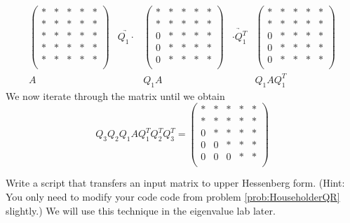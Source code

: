 \[
\begin{array}{ccccc} 
\begin{pmatrix}
* & * & * & * & *\\
* & * & * & * & *\\
* & * & * & * & *\\
* & * & * & * & *\\
* & * & * & * & *\\
\end{pmatrix} 
&\underrightarrow{Q_1 \cdot }&
\begin{pmatrix}
* & * & * & * & *\\
* & * & * & * & *\\
0 & * & * & * & *\\
0 & * & * & * & *\\
0 & * & * & * & *\\
\end{pmatrix} 
&\underrightarrow{\cdot Q_1^T }&
\begin{pmatrix}
* & * & * & * & *\\
* & * & * & * & *\\
0 & * & * & * & *\\
0 & * & * & * & *\\
0 & * & * & * & *\\
\end{pmatrix} 
\\ 
A & & Q_1A & & Q_1 A Q_1^T
  \end{array}
\]
We now iterate through the matrix until we obtain
\begin{equation*}
Q_3 Q_2 Q_1 A Q_1^T Q_2 ^T Q_3^T = 
\begin{pmatrix}
* & * & * & * & *\\
* & * & * & * & *\\
0 & * & * & * & *\\
0 & 0 & * & * & *\\
0 & 0 & 0 & * & *\\
\end{pmatrix} 
\end{equation*}

\begin{problem}
Write a script that transfers an input matrix to upper Hessenberg form. 
(Hint: You only need to modify your code code from problem \ref{prob:HouseholderQR} slightly.) 
We will use this technique in the eigenvalue lab later.
\end{problem}




